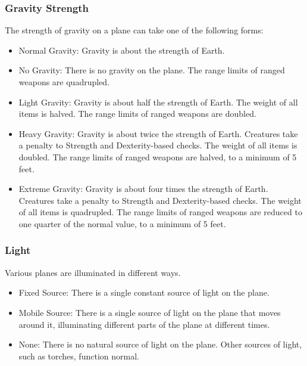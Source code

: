         \subsubsection{Gravity Strength} The strength of gravity on a plane can take one of the following forms:
            \begin{itemize}
                \item Normal Gravity: Gravity is about the strength of Earth.
                \item No Gravity: There is no gravity on the plane.
                    The range limits of ranged weapons are quadrupled.
                \item Light Gravity: Gravity is about half the strength of Earth.
                    The weight of all items is halved.
                    The range limits of ranged weapons are doubled.
                \item Heavy Gravity: Gravity is about twice the strength of Earth.
                    Creatures take a  penalty to Strength and Dexterity-based checks.
                    The weight of all items is doubled.
                    The range limits of ranged weapons are halved, to a minimum of 5 feet.
                \item Extreme Gravity: Gravity is about four times the strength of Earth.
                    Creatures take a  penalty to Strength and Dexterity-based checks.
                    The weight of all items is quadrupled.
                    The range limits of ranged weapons are reduced to one quarter of the normal value, to a minimum of 5 feet.
            \end{itemize}

        \subsubsection{Light} Various planes are illuminated in different ways.
            \begin{itemize}
                \item Fixed Source: There is a single constant source of light on the plane.
                \item Mobile Source: There is a single source of light on the plane that moves around it, illuminating different parts of the plane at different times.
                \item None: There is no natural source of light on the plane.
                    Other sources of light, such as torches, function normal.
            \end{itemize}

